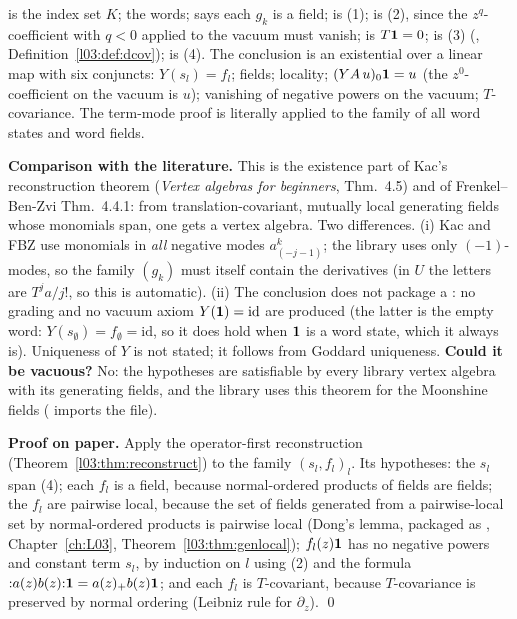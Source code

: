 \begin{dictionary}
 is the index set $K$;  the words;  says each $g_k$ is a field;  is (1);  is
(2), since the $z^q$-coefficient with $q<0$ applied to the vacuum must vanish;  is $T\mathbf{1} = 0$;  is (3)
(, Definition~\ref{l03:def:dcov});  is (4). The conclusion is an existential over a linear map
 with six conjuncts: $Y(s_l) = f_l$; fields; locality; $(YA\,u)_0\mathbf{1} = u$ (the
$z^0$-coefficient on the vacuum is $u$); vanishing of negative powers on the vacuum; $T$-covariance. The term-mode proof is
literally  applied to the family of all word states and word fields.

\textbf{Comparison with the literature.} This is the existence part of Kac's reconstruction theorem (\emph{Vertex algebras for
beginners}, Thm.~4.5) and of Frenkel--Ben-Zvi Thm.~4.4.1: from translation-covariant, mutually local generating fields whose
monomials span, one gets a vertex algebra. Two differences. (i) Kac and FBZ use monomials in \emph{all} negative modes
$a^{k}_{(-j-1)}$; the library uses only $(-1)$-modes, so the family $(g_k)$ must itself contain the derivatives (in $U$ the letters
are $T^ja/j!$, so this is automatic). (ii) The conclusion does not package a : no grading and no vacuum axiom
$Y(\mathbf{1}) = \mathrm{id}$ are produced (the latter is the empty word: $Y(s_\emptyset) = f_\emptyset = \mathrm{id}$, so it does
hold when $\mathbf{1}$ is a word state, which it always is). Uniqueness of $Y$ is not stated; it follows from Goddard uniqueness.
\textbf{Could it be vacuous?} No: the hypotheses are satisfiable by every library vertex algebra with its generating fields, and
the library uses this theorem for the Moonshine fields ( imports
the file).
\end{dictionary}

\textbf{Proof on paper.} Apply the operator-first reconstruction (Theorem~\ref{l03:thm:reconstruct}) to the family $(s_l,f_l)_l$.
Its hypotheses: the $s_l$ span (4); each $f_l$ is a field, because normal-ordered products of fields are fields; the $f_l$ are
pairwise local, because the set of fields generated from a pairwise-local set by normal-ordered products is pairwise local (Dong's
lemma, packaged as \allowbreak{}\allowbreak{}\allowbreak{}, Chapter~\ref{ch:L03}, Theorem~\ref{l03:thm:genlocal}); $f_l(z)\mathbf{1}$
has no negative powers and constant term $s_l$, by induction on $l$ using (2) and the formula
${:}a(z)b(z){:}\mathbf{1} = a(z)_+b(z)\mathbf{1}$; and each $f_l$ is $T$-covariant, because $T$-covariance is preserved by normal
ordering (Leibniz rule for $\partial_z$). \qed

